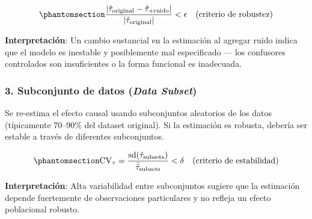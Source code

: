 \documentclass[
  spanish,
  11pt,
  letterpaper,
]{scrbook}
\theoremstyle{plain}
\theoremstyle{remark}
\begin{document}
\begin{equation}\protect\phantomsection\label{eq-random-cause}{
\frac{|\hat{\tau}_{\text{original}} - \hat{\tau}_{\text{+ruido}}|}{|\hat{\tau}_{\text{original}}|} < \epsilon \quad \text{(criterio de robustez)}
}\end{equation}

\textbf{Interpretación}: Un cambio sustancial en la estimación al
agregar ruido indica que el modelo es inestable y posiblemente mal
especificado --- los confusores controlados son insuficientes o la forma
funcional es inadecuada.

\subsubsection{\texorpdfstring{3. Subconjunto de datos (\emph{Data
Subset})}{3. Subconjunto de datos (Data Subset)}}\label{subconjunto-de-datos-data-subset}

Se re-estima el efecto causal usando subconjuntos aleatorios de los
datos (típicamente 70--90\% del dataset original). Si la estimación es
robusta, debería ser estable a través de diferentes subconjuntos.

\begin{equation}\protect\phantomsection\label{eq-subset}{
\text{CV}_{\tau} = \frac{\text{sd}(\hat{\tau}_{\text{subsets}})}{\bar{\hat{\tau}}_{\text{subsets}}} < \delta \quad \text{(criterio de estabilidad)}
}\end{equation}

\textbf{Interpretación}: Alta variabilidad entre subconjuntos sugiere
que la estimación depende fuertemente de observaciones particulares y no
refleja un efecto poblacional robusto.
\end{document}
